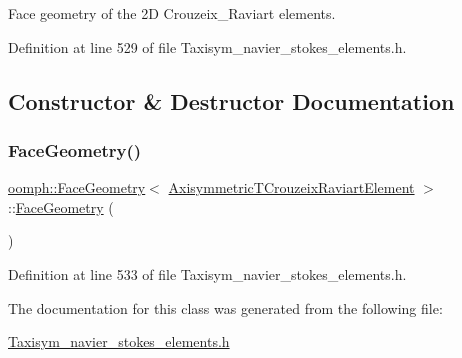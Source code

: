 Face geometry of the 2D Crouzeix\+\_\+\+Raviart elements. 

Definition at line 529 of file Taxisym\+\_\+navier\+\_\+stokes\+\_\+elements.\+h.



\subsection{Constructor \& Destructor Documentation}
\mbox{\label{classoomph_1_1FaceGeometry_3_01AxisymmetricTCrouzeixRaviartElement_01_4_a3394e0d5a5eaad11fd762efb0cfcf4fe}} 
\subsubsection{\texorpdfstring{Face\+Geometry()}{FaceGeometry()}}
{\footnotesize\ttfamily \hyperlink{classoomph_1_1FaceGeometry}{oomph\+::\+Face\+Geometry}$<$ \hyperlink{classoomph_1_1AxisymmetricTCrouzeixRaviartElement}{Axisymmetric\+T\+Crouzeix\+Raviart\+Element} $>$\+::\hyperlink{classoomph_1_1FaceGeometry}{Face\+Geometry} (\begin{DoxyParamCaption}{ }\end{DoxyParamCaption})\hspace{0.3cm}{\ttfamily [inline]}}



Definition at line 533 of file Taxisym\+\_\+navier\+\_\+stokes\+\_\+elements.\+h.



The documentation for this class was generated from the following file\+:\begin{DoxyCompactItemize}
\item 
\hyperlink{Taxisym__navier__stokes__elements_8h}{Taxisym\+\_\+navier\+\_\+stokes\+\_\+elements.\+h}\end{DoxyCompactItemize}
